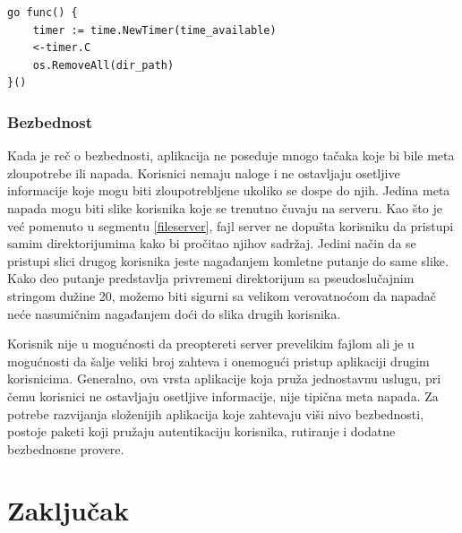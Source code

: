 \documentclass[12pt,oneside]{memoir}
\begin{document}
\begin{center}
\begin{lstlisting}[caption=Gorutina za brisanje privremenih direktorijuma,label={lst:clean},  backgroundcolor=\color{background}]
go func() {
	timer := time.NewTimer(time_available)
	<-timer.C
	os.RemoveAll(dir_path)
}()
\end{lstlisting}
\end{center}


\subsection{Bezbednost}

Kada je reč o bezbednosti, aplikacija ne poseduje mnogo tačaka koje bi bile meta zloupotrebe ili napada. Korisnici nemaju naloge i ne ostavljaju osetljive informacije koje mogu biti zloupotrebljene ukoliko se dospe do njih. Jedina meta napada mogu biti slike korisnika koje se trenutno čuvaju na serveru. Kao što je već pomenuto u segmentu \ref{fileserver}, fajl server ne dopušta korisniku da pristupi samim direktorijumima kako bi pročitao njihov sadržaj. Jedini način da se pristupi slici drugog korisnika jeste nagađanjem komletne putanje do same slike. Kako deo putanje predstavlja privremeni direktorijum sa pseudoslučajnim stringom dužine 20, možemo biti sigurni sa velikom verovatnoćom da napadač neće nasumičnim nagađanjem doći do slika drugih korisnika. 

Korisnik nije u mogućnosti da preoptereti server prevelikim fajlom ali je u mogućnosti da šalje veliki broj zahteva i onemogući pristup aplikaciji drugim korisnicima. Generalno, ova vrsta aplikacije koja pruža jednostavnu uslugu, pri čemu korisnici ne ostavljaju osetljive informacije, nije tipična meta napada. Za potrebe razvijanja složenijih aplikacija koje zahtevaju viši nivo bezbednosti, postoje paketi koji pružaju autentikaciju korisnika, rutiranje i dodatne bezbednosne provere. 

\chapter{Zaključak}





\printbibliography 
\backmatter
\end{document}
